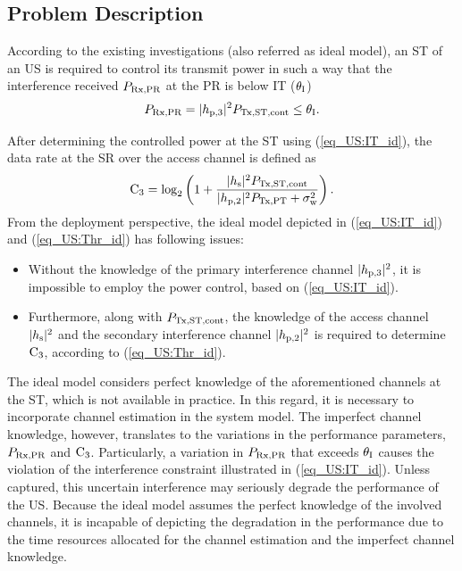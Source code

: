 \subsection{Problem Description} \label{ssec_US:pd}
According to the existing investigations (also referred as ideal model), an ST of an US is required to control its transmit power in such a way that the interference received $P_{\text{Rx,PR}}$ at the PR is below IT ($\theta_{\text{I}}$) \cite{Xing07}
\begin{equation}
P_{\text{Rx,PR}} = |h_{\text{p,3}}|^2 P_{\text{Tx,ST,cont}} \le \theta_{\text{I}}.
\label{eq_US:IT_id}
\end{equation}

After determining the controlled power at the ST using (\ref{eq_US:IT_id}), the data rate at the SR over the access channel is defined as
\begin{equation}
\text{C}_{\text{3}} = \log_2 \left(1 + \frac{|h_{\text{s}}|^2 P_{\text{Tx,ST,cont}}}{ |h_{\text{p,2}}|^2 P_{\text{Tx,PT}} + \sigma^2_{\text{w}}} \right). 
\label{eq_US:Thr_id}
\end{equation}
From the deployment perspective, the ideal model depicted in (\ref{eq_US:IT_id}) and (\ref{eq_US:Thr_id}) has following issues:
\begin{itemize}
\item Without the knowledge of the primary interference channel $|h_{\text{p,3}}|^2$, it is impossible to employ the power control, based on (\ref{eq_US:IT_id}). 
\item Furthermore, along with $P_{\text{Tx,ST,cont}}$, the knowledge of the access channel $|h_{\text{s}}|^2$ and the secondary interference channel $|h_{\text{p,2}}|^2$ is required to determine $\text{C}_{\text{3}}$, according to (\ref{eq_US:Thr_id}).
\end{itemize}
The ideal model considers perfect knowledge of the aforementioned channels at the ST, which is not available in practice. In this regard, it is necessary to incorporate channel estimation in the system model. The imperfect channel knowledge, however, translates to the variations in the performance parameters, $P_{\text{Rx,PR}}$ and $\text{C}_{\text{3}}$. Particularly, a variation in $P_{\text{Rx,PR}}$ that exceeds $\theta_{\text{I}}$ causes the violation of the interference constraint illustrated in (\ref{eq_US:IT_id}). Unless captured, this uncertain interference may seriously degrade the performance of the US. Because the ideal model assumes the perfect knowledge of the involved channels, it is incapable of depicting the degradation in the performance due to the time resources allocated for the channel estimation and the imperfect channel knowledge. %

